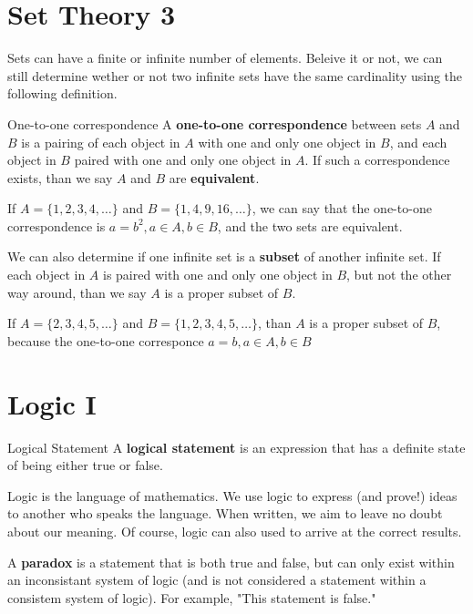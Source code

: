 \chapter{Set Theory 3}

Sets can have a finite or infinite number of elements. Beleive it or not, we can still determine wether or not two infinite sets have the same cardinality using the following definition.

\begin{boxdefine}{One-to-one correspondence}{}
	A {\bf one-to-one correspondence} between sets $A$ and $B$ is a pairing of each object in $A$ with one and only one object in $B$, and each object in $B$ paired with one and only one object in $A$. If such a correspondence exists, than we say $A$ and $B$ are {\bf equivalent}.
\end{boxdefine}

\begin{boxexample}{}{}
	If $A=\{1,2,3,4,\dots\}$ and $B=\{1,4,9,16,\dots\}$, we can say that the one-to-one correspondence is $a=b^2, a \in A, b \in B$, and the two sets are equivalent.
\end{boxexample}

We can also determine if one infinite set is a {\bf subset} of another infinite set. If each object in $A$ is paired with one and only one object in $B$, but not the other way around, than we say $A$ is a proper subset of $B$.

\begin{boxexample}{}{}
	If $A=\{2,3,4,5,\dots\}$ and $B=\{1,2,3,4,5,\dots\}$, than $A$ is a proper subset of $B$, because the one-to-one corresponce $a=b, a \in A, b \in B$
\end{boxexample}

\chapter{Logic I}

\begin{boxdefine}{Logical Statement}{}
A {\bf logical statement} is an expression that has a definite state of being either true or false.
\end{boxdefine}

Logic is the language of mathematics. We use logic to express (and prove!) ideas to another who speaks the language. When written, we aim to leave no doubt about our meaning. Of course, logic can also used to arrive at the correct results.

\begin{boxremark}{}{}
	A {\bf paradox} is a statement that is both true and false, but can only exist within an inconsistant system of logic (and is not considered a statement within a consistem system of logic). For example, "This statement is false."
\end{boxremark}

